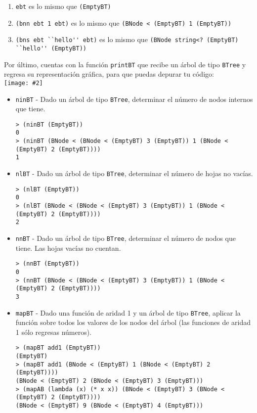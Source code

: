 \documentclass{article}
\newcommand{\jimage}[2]{\texttt{[image: \#2]}\vskip10pt}
\begin{document}
\begin{enumerate}
\item \verb;ebt; es lo mismo que \verb;(EmptyBT);
\item \verb;(bnn ebt 1 ebt); es lo mismo que \verb;(BNode < (EmptyBT) 1 (EmptyBT));
\item \verb;(bns ebt ``hello'' ebt); es lo mismo que \verb;(BNode string<? (EmptyBT) ``hello'' (EmptyBT));
\end{enumerate}

Por último, cuentas con la función \verb;printBT; que recibe un árbol de tipo \verb;BTree; y regresa su representación gráfica, para que puedas depurar tu código: \\

\jimage{0.9}{imgs/printbt1.png}

\begin{itemize}
\item \texttt{ninBT} - Dado un árbol de tipo \verb;BTree;, determinar el número de nodos internos que tiene.
\begin{verbatim}
> (ninBT (EmptyBT))
0
> (ninBT (BNode < (BNode < (EmptyBT) 3 (EmptyBT)) 1 (BNode < (EmptyBT) 2 (EmptyBT))))
1
\end{verbatim}

\item \texttt{nlBT} - Dado un árbol de tipo \verb;BTree;, determinar el número de hojas no vacías.
\begin{verbatim}
> (nlBT (EmptyBT))
0
> (nlBT (BNode < (BNode < (EmptyBT) 3 (EmptyBT)) 1 (BNode < (EmptyBT) 2 (EmptyBT))))
2
\end{verbatim}

\item \texttt{nnBT} - Dado un árbol de tipo \verb;BTree;, determinar el número de nodos que tiene. Las hojas vacías no cuentan.
\begin{verbatim}
> (nnBT (EmptyBT))
0
> (nnBT (BNode < (BNode < (EmptyBT) 3 (EmptyBT)) 1 (BNode < (EmptyBT) 2 (EmptyBT))))
3
\end{verbatim}

\item \texttt{mapBT} - Dado una función de aridad 1 y un árbol de tipo \verb;BTree;, aplicar la función sobre todos los valores de los nodos del árbol (las funciones de aridad 1 sólo regresas números).
\begin{verbatim}
> (mapBT add1 (EmptyBT))
(EmptyBT)
> (mapBT add1 (BNode < (EmptyBT) 1 (BNode < (EmptyBT) 2 (EmptyBT))))
(BNode < (EmptyBT) 2 (BNode < (EmptyBT) 3 (EmptyBT)))
> (mapAB (lambda (x) (* x x)) (BNode < (EmptyBT) 3 (BNode < (EmptyBT) 2 (EmptyBT))))
(BNode < (EmptyBT) 9 (BNode < (EmptyBT) 4 (EmptyBT)))
\end{verbatim}
\end{itemize}
\end{document}
